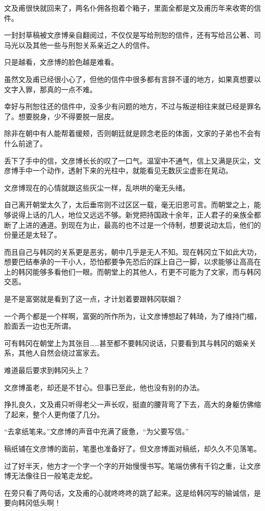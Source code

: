 文及甫很快就回来了，两名仆佣各抱着个箱子，里面全都是文及甫历年来收寄的信件。

一封封草稿被文彦博亲自翻阅过，不仅仅是写给刑恕的信件，还有写给吕公著、司马光以及其他一些与刑恕关系亲近之人的信件。

只是越看，文彦博的脸色越是难看。

虽然文及甫已经很小心了，但他的信件中很多都有言辞不谨的地方，如果真想要以文字入罪，那真的一点不难。

幸好与刑恕往还的信件中，没多少有问题的地方，不过与叛逆相往来就已经是罪名了。想要脱身，少不得要脱一层皮。

除非在朝中有人能帮着缓颊，否则朝廷就是顾念老臣的体面，文家的子弟也不会有什么前途了。

丢下了手中的信，文彦博长长的叹了一口气。温室中不通气，信上又满是灰尘，文彦博手中一个动作，透射下来的光柱中，就能看见无数灰尘虚影在晃动。

文彦博现在的心情就跟这些灰尘一样，乱哄哄的毫无头绪。

自己离开朝堂太久了，太后垂帘则不过区区一载，毫无旧恩可言。而朝堂之上，能够说得上话的几人，地位又远远不够。新党把持国政十余年，正人君子的亲族全都断了上进的通道。到现在为止，最高的也不过是一个侍制，想要说动太后，他们的份量还是太轻了。

而且自己与韩冈的关系更是恶劣，朝中几乎是无人不知。现在韩冈立下如此大功，想要巴结奉承的一干小人，恐怕都要争先恐后的踩上自己一脚，以求能够让高高在上的韩冈能够多看他们一眼。而朝堂上的其他人，冇更不可能为了文家，而与韩冈交恶。

是不是富弼就是看到了这一点，才计划着要跟韩冈联姻？

一个两个都是一个样啊，富弼的所作所为，让文彦博想起了韩琦，为了维持门楣，脸面丢一边也无所谓。

可有韩冈在朝堂上为其张目……甚至都不要韩冈说话，只要看到其与韩冈的姻亲关系，其他人自然会绕过富家去。

难道最后要求到韩冈头上？

文彦博虽老，却还是不甘心。但事已至此，他也没有别的办法。

挣扎良久，文及甫只听得老父一声长叹，挺直的腰背弯了下去，高大的身躯仿佛缩了起来，整个人更佝偻了几分。

“去拿纸笔来。”文彦博的声音中充满了疲惫，“为父要写信。”

稿纸铺在文彦博的面前，笔墨也准备好了。但文彦博面对稿纸，却久久不见落笔。

过了好半天，他方才一个字一个字的开始慢慢书写。笔端仿佛有千钧之重，让文彦博无法像往日一般笔走龙蛇。

在旁只看了两句话，文及甫的心就咚咚咚的跳了起来。这是给韩冈写的输诚信，是要向韩冈低头啊！

